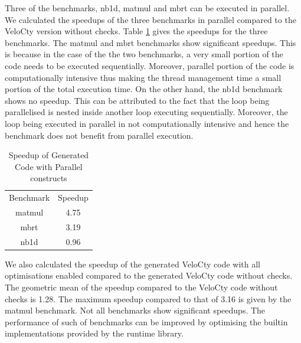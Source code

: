 Three of the \matlab benchmarks, nb1d, matmul and mbrt can be executed in parallel. We calculated the speedups of the three benchmarks in parallel compared to the VeloCty version without checks. Table \ref{tab:cpvscwo} gives the speedups for the three benchmarks. The matmul and mbrt benchmarks show significant speedups. This is because in the case of the the two benchmarks, a very small portion of the code needs to be executed sequentially. Moreover, parallel portion of the code is computationally intensive thus making the thread management time a small portion of the total execution time. On the other hand, the nb1d benchmark shows no speedup. This can be attributed to the fact that the loop being parallelised is nested inside another loop executing sequentially. Moreover, the loop being executed in parallel in not computationally intensive and hence the benchmark does not benefit from parallel execution. 
\begin{table}[htbp]
\centering
\begin{tabular}{|c|c|}
\hline
Benchmark & Speedup \\ \hhline{|=|=|}
matmul    & 4.75    \\ \hline
mbrt      & 3.19    \\ \hline
nb1d      & 0.96    \\ \hline
\end{tabular}
\caption{Speedup of Generated Code with Parallel constructs}
\label{tab:cpvscwo}
\end{table}

We also calculated the speedup of the generated VeloCty code with all optimisations enabled compared to the generated VeloCty code without checks. The geometric mean of the speedup compared to the VeloCty code without checks is 1.28. The maximum speedup compared to that of  3.16 is given by the matmul benchmark. Not all benchmarks show significant speedups. The performance of such of benchmarks can be improved by optimising the builtin implementations provided by the runtime library.

